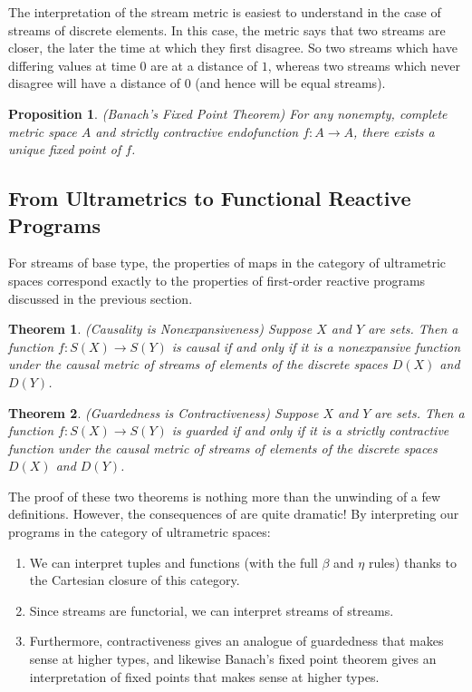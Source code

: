 \documentclass[nocopyrightspace,preprint]{sigplanconf}
\newtheorem{prop}{Proposition}
\newtheorem{theorem}{Theorem}
\begin{document}
The interpretation of the stream metric is easiest to understand in
the case of streams of discrete elements. In this case, the metric
says that two streams are closer, the later the time at which they
first disagree. So two streams which have differing values at time $0$
are at a distance of $1$, whereas two streams which never disagree
will have a distance of $0$ (and hence will be equal streams).

\begin{prop}{(Banach's Fixed Point Theorem)}
For any nonempty, complete metric space $A$ and strictly contractive
endofunction $f : A \to A$, there exists a unique fixed point of $f$.
\end{prop}

\subsection{From Ultrametrics to Functional Reactive Programs}

For streams of base type, the properties of maps
in the category of ultrametric spaces correspond exactly to the
properties of first-order reactive programs discussed in the
previous section.

\begin{theorem}{(Causality is Nonexpansiveness)}
Suppose $X$ and $Y$ are sets. Then a function $f : S(X) \to
S(Y)$ is causal if and only if it is a nonexpansive function under
the causal metric of streams of elements of the discrete spaces $D(X)$
and $D(Y)$.
\end{theorem}

\begin{theorem}{(Guardedness is Contractiveness)}
Suppose $X$ and $Y$ are sets. Then a function $f : S(X) \to
S(Y)$ is guarded if and only if it is a strictly contractive
function under the causal metric of streams of elements of the
discrete spaces $D(X)$ and $D(Y)$.
\end{theorem}

The proof of these two theorems is nothing more than the unwinding of
a few definitions. However, the consequences of are quite dramatic! By
interpreting our programs in the category of ultrametric spaces:
\begin{enumerate}
\item We can interpret tuples and functions (with the full $\beta$ and
  $\eta$ rules) thanks to the Cartesian closure of this category.
\item Since streams are functorial, we can interpret streams of
  streams.
\item Furthermore, contractiveness gives an analogue of guardedness
  that makes sense at higher types, and likewise Banach's fixed point
  theorem gives an interpretation of fixed points that makes sense at
  higher types.
\end{enumerate}
\end{document}
